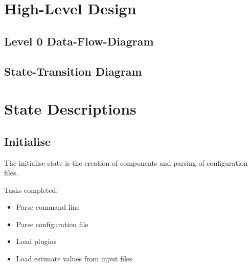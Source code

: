 \documentclass[a4paper,11pt,twoside,pdftex,draft]{article}
\providecommand{\tightlist}{%
  \setlength{\itemsep}{0pt}\setlength{\parskip}{0pt}}
\begin{document}
\hypertarget{high-level-design}{%
\section[High-Level
Design]{\texorpdfstring{\protect\hypertarget{anchor-15}{}{}High-Level
Design}{High-Level Design}}\label{high-level-design}}

\hypertarget{level-0-data-flow-diagram}{%
\subsection[Level 0
Data-Flow-Diagram]{\texorpdfstring{\protect\hypertarget{anchor-16}{}{}Level
0
Data-Flow-Diagram}{Level 0 Data-Flow-Diagram}}\label{level-0-data-flow-diagram}}


\hypertarget{state-transition-diagram}{%
\subsection[State-Transition
Diagram]{\texorpdfstring{\protect\hypertarget{anchor-17}{}{}State-Transition
Diagram}{State-Transition Diagram}}\label{state-transition-diagram}}


\hypertarget{state-descriptions}{%
\section{State Descriptions}\label{state-descriptions}}

\hypertarget{initialise}{%
\subsection{Initialise}\label{initialise}}

The initialise state is the creation of components and parsing of
configuration files.

Tasks completed:

\begin{itemize}
\tightlist
\item
  Parse command line
\item
  Parse configuration file
\item
  Load plugins
\item
  Load estimate values from input files
\end{itemize}
\end{document}
